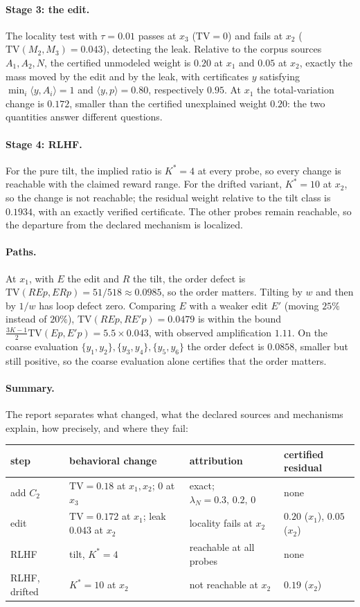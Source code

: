 \documentclass[11pt]{article}
\theoremstyle{definition}
\theoremstyle{remark}
\newcommand{\TV}{\mathrm{TV}}
\begin{document}
\paragraph{Stage 3: the edit.} The locality test with $\tau=0.01$ passes at $x_3$ ($\TV=0$) and fails at
$x_2$ ($\TV(M_2,M_3)=0.043$), detecting the leak. Relative to the corpus sources $A_1,A_2,N$, the
certified unmodeled weight is $0.20$ at $x_1$ and $0.05$ at $x_2$, exactly the mass moved by the edit
and by the leak, with certificates $y$ satisfying $\min_i\langle y,A_i\rangle=1$ and $\langle
y,p\rangle=0.80$, respectively $0.95$. At $x_1$ the total-variation change is $0.172$, smaller than the
certified unexplained weight $0.20$: the two quantities answer different questions.

\paragraph{Stage 4: RLHF.} For the pure tilt, the implied ratio is $K^*=4$ at every probe, so every
change is reachable with the claimed reward range. For the drifted variant, $K^*=10$ at $x_2$, so the
change is not reachable; the residual weight relative to the tilt class is $0.1934$, with an exactly
verified certificate. The other probes remain reachable, so the departure from the declared mechanism
is localized.

\paragraph{Paths.} At $x_1$, with $E$ the edit and $R$ the tilt, the order defect is
$\TV(REp,ERp)=51/518\approx0.0985$, so the order matters. Tilting by $w$ and then by $1/w$ has loop defect
zero. Comparing $E$ with a weaker edit $E'$ (moving $25\%$ instead of $20\%$),
$\TV(REp,RE'p)=0.0479$ is within the bound $\tfrac{3K-1}2\TV(Ep,E'p)=5.5\times0.043$, with observed
amplification $1.11$. On the coarse evaluation $\{y_1,y_2\},\{y_3,y_4\},\{y_5,y_6\}$ the order defect is
$0.0858$, smaller but still positive, so the coarse evaluation alone certifies that the order matters.

\paragraph{Summary.} The report separates what changed, what the declared sources and mechanisms
explain, how precisely, and where they fail:
\begin{center}\small
\begin{tabular}{@{}llll@{}}
\toprule
step & behavioral change & attribution & certified residual\\
\midrule
add $C_2$ & $\TV=0.18$ at $x_1,x_2$; $0$ at $x_3$ & exact; $\lambda_N=0.3,\,0.2,\,0$ & none\\
edit & $\TV=0.172$ at $x_1$; leak $0.043$ at $x_2$ & locality fails at $x_2$ & $0.20$ ($x_1$), $0.05$ ($x_2$)\\
RLHF & tilt, $K^*=4$ & reachable at all probes & none\\
RLHF, drifted & $K^*=10$ at $x_2$ & not reachable at $x_2$ & $0.19$ ($x_2$)\\
\bottomrule
\end{tabular}
\end{center}
\end{document}
